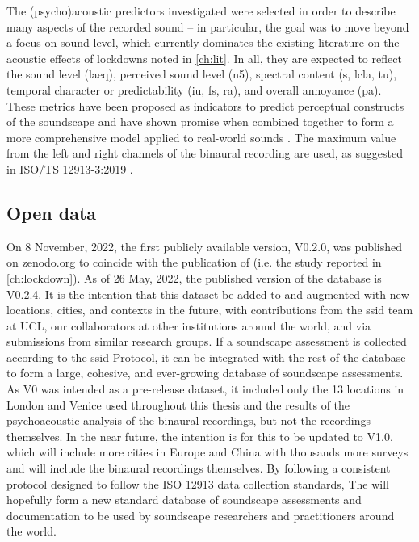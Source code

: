    The (psycho)acoustic predictors investigated were selected in order to describe many aspects of the recorded sound -- in particular, the goal was to move beyond a focus on sound level, which currently dominates the existing literature on the acoustic effects of lockdowns noted in \cref{ch:lit}. In all, they are expected to reflect the sound level (\gls{laeq}), perceived sound level (\gls{n5}), spectral content (\gls{s}, \gls{lcla}, \gls{tu}), temporal character or predictability (\gls{iu}, \gls{fs}, \gls{ra}), and overall annoyance (\gls{pa}). These metrics have been proposed as indicators to predict perceptual constructs of the soundscape \citep{Aletta2017Dimensions, Aletta2016Soundscape} and have shown promise when combined together to form a more comprehensive model applied to real-world sounds \citep{Orga2021Multilevel}. The maximum value from the left and right channels of the binaural recording are used, as suggested in ISO/TS 12913-3:2019 \citep{ISO12913Part3}.


\subsection{Open data}
On 8 November, 2022, the first publicly available version, V0.2.0, was published on zenodo.org to coincide with the publication of \citet{Mitchell2021Investigating} (i.e. the study reported in \cref{ch:lockdown}). As of 26 May, 2022, the published version of the database is V0.2.4. It is the intention that this dataset be added to and augmented with new locations, cities, and contexts in the future, with contributions from the \gls{ssid} team at UCL, our collaborators at other institutions around the world, and via submissions from similar research groups. If a soundscape assessment is collected according to the \gls{ssid} Protocol, it can be integrated with the rest of the database to form a large, cohesive, and ever-growing database of soundscape assessments. As V0 was intended as a pre-release dataset, it included only the 13 locations in London and Venice used throughout this thesis and the results of the psychoacoustic analysis of the binaural recordings, but not the recordings themselves. In the near future, the intention is for this to be updated to V1.0, which will include more cities in Europe and China with thousands more surveys and will include the binaural recordings themselves. By following a consistent protocol designed to follow the ISO 12913 data collection standards, The  \citep{Mitchell2021International} will hopefully form a new standard database of soundscape assessments and documentation to be used by soundscape researchers and practitioners around the world.


